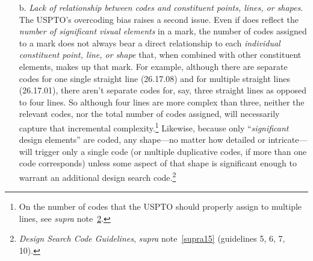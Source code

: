 \documentclass[letterpaper, 11pt, oneside]{article}
\begin{document}
\begin{enumerate}
Coders are also instructed to code visual elements in applicants' mark drawings \emph{even where applicants expressly disclaim those elements}. Such elements are typically shown in dashed lines. For example, adidas's registration for the mark \texttt{[image: RN\_3029127\_drawing]},\footnote{Reg. No. 3029127.} which consists of adidas's three-stripe trade dress on a garment, expressly disclaims the garment on which the mark is shown, because adidas is claiming the design \emph{on} the garment, not the garment itself. Yet in addition to the design search code for straight lines (26.17.01), the USPTO also assigned this mark the design search code for jackets (09.03.01). This makes sense from the perspective of providing actual notice to potential infringers. The disclaimed matter is essential, because it is the commercial context in which adidas uses the mark. However, from the perspective of measuring mark complexity, the presence of two codes suggests that there are two significant elements in the mark when, arguably, we should focus only on the claimed matter, the three stripes, which amount to one element (or perhaps three distinct elements).\footnote{\label{supra26} Indeed, per its own guidance, the USPTO should actually have coded the adidas three-stripe mark for \emph{both} three lines \emph{and} a single line. \textit{See supra} note~\ref{supra25}.} Viewed from this angle, coding disclaimed matter contributes to a general tendency to overcode, rather than undercode. The upshot is that the relationship between a mark's significant design elements and the number of design search codes it has is far from perfectly linear. 

\item[b.] \textit{Lack of relationship between codes and constituent points, lines, or shapes}. The USPTO's overcoding bias raises a second issue. Even if does reflect the \emph{number of significant visual elements} in a mark, the number of codes assigned to a mark does not always bear a direct relationship to each \emph{individual constituent point, line, or shape} that, when combined with other constituent elements, makes up that mark. For example, although there are separate codes for one single straight line (26.17.08) and for multiple straight lines (26.17.01), there aren't separate codes for, say, three straight lines as opposed to four lines. So although four lines are more complex than three, neither the relevant codes, nor the total number of codes assigned, will necessarily capture that incremental complexity.\footnote{On the number of codes that the USPTO should properly assign to multiple lines, see \textit{supra} note~\ref{supra26}.} Likewise, because only ``\emph{significant} design elements'' are coded, any shape—no matter how detailed or intricate—will trigger only a single code (or multiple duplicative codes, if more than one code corresponds) unless some aspect of that shape is significant enough to warrant an additional design search code.\footnote{\textit{Design Search Code Guidelines}, \textit{supra} note~\ref{supra15} (guidelines 5, 6, 7, 10).}


\end{enumerate}
\end{document}
